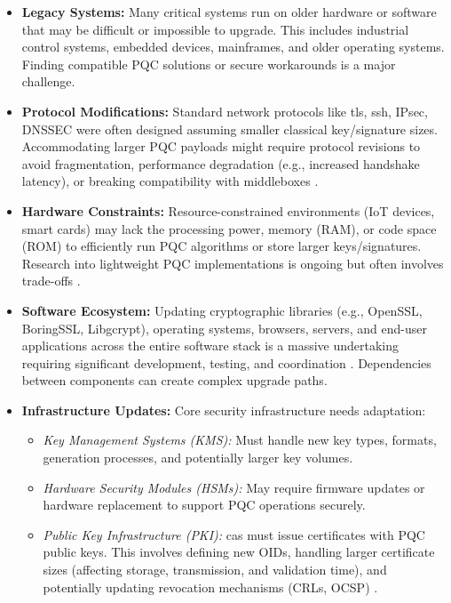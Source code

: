 \begin{itemize}
    \item \textbf{Legacy Systems:} Many critical systems run on older hardware or software that may be difficult or impossible to upgrade. This includes industrial control systems, embedded devices, mainframes, and older operating systems. Finding compatible PQC solutions or secure workarounds is a major challenge.
    \item \textbf{Protocol Modifications:} Standard network protocols like \gls{tls}, \gls{ssh}, IPsec, DNSSEC were often designed assuming smaller classical key/signature sizes. Accommodating larger PQC payloads might require protocol revisions to avoid fragmentation, performance degradation (e.g., increased handshake latency), or breaking compatibility with middleboxes \parencite{cloud_pqc_2024}.
    \item \textbf{Hardware Constraints:} Resource-constrained environments (IoT devices, smart cards) may lack the processing power, memory (RAM), or code space (ROM) to efficiently run PQC algorithms or store larger keys/signatures. Research into lightweight PQC implementations is ongoing but often involves trade-offs \parencite{iot_pqc_2024}.
    \item \textbf{Software Ecosystem:} Updating cryptographic libraries (e.g., OpenSSL, BoringSSL, Libgcrypt), operating systems, browsers, servers, and end-user applications across the entire software stack is a massive undertaking requiring significant development, testing, and coordination \parencite{software_optimization_2024}. Dependencies between components can create complex upgrade paths.

    \newpage

    \item \textbf{Infrastructure Updates:} Core security infrastructure needs adaptation:
        \begin{itemize}
            \item \textit{Key Management Systems (KMS):} Must handle new key types, formats, generation processes, and potentially larger key volumes.
            \item \textit{Hardware Security Modules (HSMs):} May require firmware updates or hardware replacement to support PQC operations securely.
            \item \textit{Public Key Infrastructure (PKI):} \glspl{ca} must issue certificates with PQC public keys. This involves defining new OIDs, handling larger certificate sizes (affecting storage, transmission, and validation time), and potentially updating revocation mechanisms (CRLs, OCSP) \parencite{pqc_applications_2024}.
        \end{itemize}
\end{itemize}

